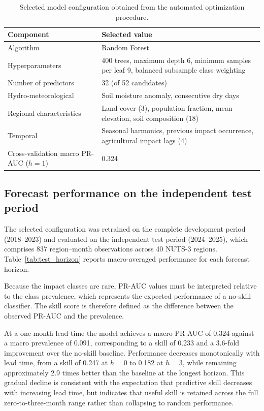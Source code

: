 \begin{table}[h]
\centering
\small
\caption{Selected model configuration obtained from the automated optimization procedure.}
\label{tab:best_config}
\begin{tabular}{p{4.5cm} p{9.5cm}}
\toprule
\textbf{Component} & \textbf{Selected value} \\
\midrule
Algorithm & Random Forest \\
Hyperparameters & 400 trees, maximum depth 6, minimum samples per leaf 9, balanced subsample class weighting \\
Number of predictors & 32 (of 52 candidates) \\
Hydro-meteorological & Soil moisture anomaly, consecutive dry days \\
Regional characteristics & Land cover (3), population fraction, mean elevation, soil composition (18) \\
Temporal & Seasonal harmonics, previous impact occurrence, agricultural impact lags (4) \\
Cross-validation macro PR-AUC ($h=1$) & 0.324 \\
\bottomrule
\end{tabular}
\end{table}

\subsection{Forecast performance on the independent test period}

The selected configuration was retrained on the complete development period
(2018--2023) and evaluated on the independent test period (2024--2025), which
comprises 837 region--month observations across 40 NUTS-3 regions.
Table~\ref{tab:test_horizon} reports macro-averaged performance for each
forecast horizon.

Because the impact classes are rare, PR-AUC values must be interpreted relative
to the class prevalence, which represents the expected performance of a
no-skill classifier. The skill score is therefore defined as the difference
between the observed PR-AUC and the prevalence.

At a one-month lead time the model achieves a macro PR-AUC of 0.324 against a
macro prevalence of 0.091, corresponding to a skill of 0.233 and a 3.6-fold
improvement over the no-skill baseline. Performance decreases monotonically
with lead time, from a skill of 0.247 at $h=0$ to 0.182 at $h=3$, while
remaining approximately 2.9 times better than the baseline at the longest
horizon. This gradual decline is consistent with the expectation that
predictive skill decreases with increasing lead time, but indicates that useful
skill is retained across the full zero-to-three-month range rather than
collapsing to random performance.

